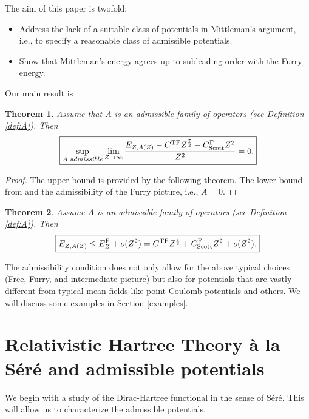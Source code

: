 \documentclass[a4paper]{amsart}
\newtheorem{theorem}{Theorem}
\begin{document}
The aim of this paper is twofold:
\begin{itemize}
\item Address the lack of a suitable class of potentials in Mittleman's
  argument, i.e., to specify a reasonable class of admissible
  potentials.
\item Show that Mittleman's energy agrees up to subleading order with the Furry energy.
\end{itemize}
Our main result is
\begin{theorem}
  \label{th:1}
  Assume that $A$ is an admissible family of operators (see Definition
  \ref{def:A}). Then
  \begin{equation}\label{eq:Mittleman}
    \boxed{\sup_{A\ \text admissible}\lim_{Z\to\infty}{E_{Z,A(Z)} -C^\mathrm{TF}Z^\frac73-C_\mathrm{Scott}^{\rm F}Z^2\over Z^2}=0.}
  \end{equation}
 \end{theorem}
\begin{proof}
  The upper bound is provided by the following theorem. The lower
  bound from \cite{HandrekSiedentop2015} and the admissibility of the
  Furry picture, i.e., $A=0$.
\end{proof}

\begin{theorem}
  \label{th:mittleman}
  Assume $A$ is an admissible family of operators (see Definition
  \ref{def:A}). Then
  \begin{equation}
    \boxed{E_{Z,A(Z)}\leq E_Z^\mathrm{F}+o(Z^2)=C^\mathrm{TF}Z^\frac73+C_\mathrm{Scott}^{\rm F}Z^2+o(Z^2).}
  \end{equation}
\end{theorem}

The admissibility condition does not only allow for the above typical
choices (Free, Furry, and intermediate picture) but also for
potentials that are vastly different from typical mean fields like point
Coulomb potentials and others. We will discuss some examples in Section
\ref{examples}.
                                 


\section{Relativistic Hartree Theory \`a la  S\'er\'e and admissible potentials}
\label{sec:Sere}
We begin with a study of the Dirac-Hartree functional in
the sense of S\'er\'e. This will allow us to characterize the
admissible potentials.
\end{document}
